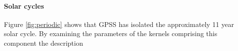 \documentclass{article}
\begin{document}



\paragraph{Solar cycles}

Figure \ref{fig:periodic} shows that GPSS has isolated the approximately 11 year solar cycle.
By examining the parameters of the kernels comprising this component the description 

%

\end{document}
